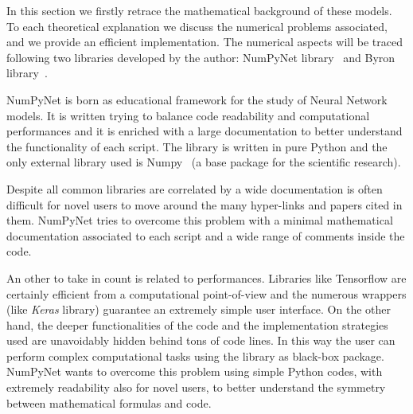 \documentclass{standalone}
\begin{document}
In this section we firstly retrace the mathematical background of these models.
To each theoretical explanation we discuss the numerical problems associated, and we provide an efficient implementation.
The numerical aspects will be traced following two libraries developed by the author: \textsf{NumPyNet} library~\cite{NumPyNet} and \textsf{Byron} library~\cite{Byron}.

\textsf{NumPyNet} is born as educational framework for the study of Neural Network models.
It is written trying to balance code readability and computational performances and it is enriched with a large documentation to better understand the functionality of each script.
The library is written in pure \textsf{Python} and the only external library used is \textsf{Numpy}~\cite{Numpy} (a base package for the scientific research).

Despite all common libraries are correlated by a wide documentation is often difficult for novel users to move around the many hyper-links and papers cited in them.
\textsf{NumPyNet} tries to overcome this problem with a minimal mathematical documentation associated to each script and a wide range of comments inside the code.

An other  to take in count is related to performances.
Libraries like \textsf{Tensorflow} are certainly efficient from a computational point-of-view and the numerous wrappers (like \emph{Keras} library) guarantee an extremely simple user interface.
On the other hand, the deeper functionalities of the code and the implementation strategies used are unavoidably hidden behind tons of code lines.
In this way the user can perform complex computational tasks using the library as black-box package.
\textsf{NumPyNet} wants to overcome this problem using simple \textsf{Python} codes, with extremely readability also for novel users, to better understand the symmetry between mathematical formulas and code.
\end{document}
